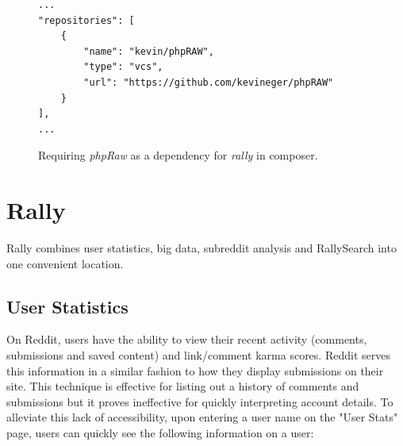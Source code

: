 \documentclass[msc,oneside]{ubcthesis}%
\begin{document}
\begin{figure}[H]
\begin{lstlisting}
...
"repositories": [
	{
		"name": "kevin/phpRAW",
		"type": "vcs",
		"url": "https://github.com/kevineger/phpRAW"
	}
],
...
\end{lstlisting}
\caption[Requiring phpRaw as a dependency in composer.]{
Requiring \textit{phpRaw} as a dependency for \textit{rally} in composer.}
\label{fig:composer}
\end{figure}

\section{Rally}
Rally combines user statistics, big data, subreddit analysis and RallySearch into one convenient location.
\subsection{User Statistics}
On Reddit, users have the ability to view their recent activity (comments, submissions and saved content) and link/comment karma scores. Reddit serves this information in a similar fashion to how they display submissions on their site. This technique is effective for listing out a history of comments and submissions but it proves ineffective for quickly interpreting account details. To alleviate this lack of accessibility, upon entering a user name on the "User Stats" page, users can quickly see the following information on a user:
\end{document}
